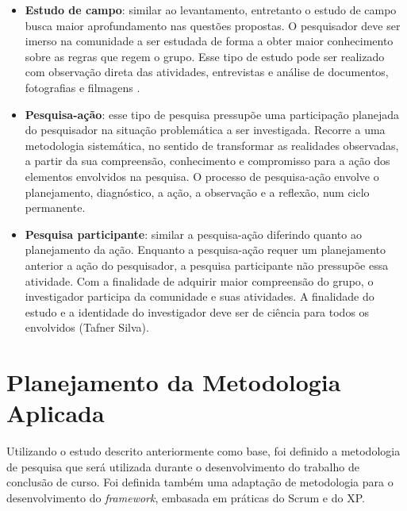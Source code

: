 \begin{itemize}
\item \textbf{Estudo de campo}: similar ao levantamento, entretanto o estudo de campo busca maior aprofundamento nas questões propostas. O pesquisador deve ser imerso na comunidade a ser estudada de forma a obter maior conhecimento sobre as regras que regem o grupo. Esse tipo de estudo pode ser realizado com observação direta das atividades, entrevistas e análise de documentos, fotografias e filmagens \cite{tafner_2007}. 

\item \textbf{Pesquisa-ação}: esse tipo de pesquisa pressupõe uma participação planejada do pesquisador na situação problemática a ser investigada. Recorre a uma metodologia sistemática, no sentido de transformar as realidades observadas, a partir da sua compreensão, conhecimento e compromisso para a ação dos elementos envolvidos na pesquisa. O processo de pesquisa-ação envolve o planejamento, diagnóstico, a ação, a observação e a reflexão, num ciclo permanente.

\item \textbf{Pesquisa participante}: similar a pesquisa-ação diferindo quanto ao planejamento da ação. Enquanto a pesquisa-ação requer um planejamento anterior a ação do pesquisador, a pesquisa participante não pressupõe essa atividade. Com a finalidade de adquirir maior compreensão do grupo, o investigador participa da comunidade e suas atividades. A finalidade do estudo e a identidade do investigador deve ser de ciência para todos os envolvidos (Tafner Silva).

\end{itemize}

 \section{Planejamento da Metodologia Aplicada}
  
Utilizando o estudo descrito anteriormente como base, foi definido a metodologia de pesquisa que será utilizada durante o desenvolvimento do trabalho de conclusão de curso.  Foi definida também uma adaptação de metodologia para o desenvolvimento do \textit{framework}, embasada em práticas do Scrum e do XP.  
  
